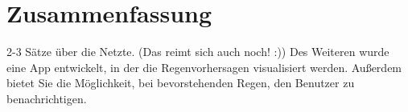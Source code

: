 \section*{Zusammenfassung}
2-3 Sätze über die Netzte. (Das reimt sich auch noch! :))
Des Weiteren wurde eine App entwickelt, in der die Regenvorhersagen visualisiert werden. 
Außerdem bietet Sie die Möglichkeit, bei bevorstehenden Regen, den Benutzer zu benachrichtigen. 